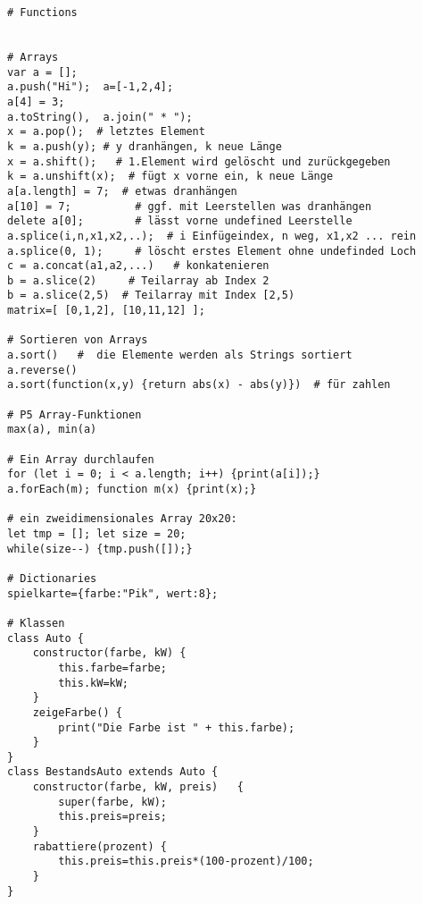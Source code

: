 \documentclass[a4paper,11pt,landscape,twocolumn]{book}
\begin{document}
\begin{lstlisting}
# Functions


# Arrays
var a = [];
a.push("Hi");  a=[-1,2,4];
a[4] = 3; 
a.toString(),  a.join(" * ");
x = a.pop();  # letztes Element
k = a.push(y); # y dranhängen, k neue Länge
x = a.shift();   # 1.Element wird gelöscht und zurückgegeben
k = a.unshift(x);  # fügt x vorne ein, k neue Länge
a[a.length] = 7;  # etwas dranhängen
a[10] = 7;          # ggf. mit Leerstellen was dranhängen
delete a[0];        # lässt vorne undefined Leerstelle  
a.splice(i,n,x1,x2,..);  # i Einfügeindex, n weg, x1,x2 ... rein
a.splice(0, 1);     # löscht erstes Element ohne undefinded Loch
c = a.concat(a1,a2,...)   # konkatenieren
b = a.slice(2)     # Teilarray ab Index 2
b = a.slice(2,5)  # Teilarray mit Index [2,5)
matrix=[ [0,1,2], [10,11,12] ];

# Sortieren von Arrays
a.sort()   #  die Elemente werden als Strings sortiert
a.reverse()
a.sort(function(x,y) {return abs(x) - abs(y)})  # für zahlen

# P5 Array-Funktionen
max(a), min(a)

# Ein Array durchlaufen
for (let i = 0; i < a.length; i++) {print(a[i]);}
a.forEach(m); function m(x) {print(x);}

# ein zweidimensionales Array 20x20:
let tmp = []; let size = 20;
while(size--) {tmp.push([]);}
      
# Dictionaries
spielkarte={farbe:"Pik", wert:8};

# Klassen
class Auto {
	constructor(farbe, kW) {
		this.farbe=farbe;
		this.kW=kW;
	}
	zeigeFarbe() {
		print("Die Farbe ist " + this.farbe);
	}
}
class BestandsAuto extends Auto {
	constructor(farbe, kW, preis)	{
		super(farbe, kW);
		this.preis=preis;
	}
	rabattiere(prozent)	{
		this.preis=this.preis*(100-prozent)/100;
	}
}
\end{lstlisting} 
\end{document}
